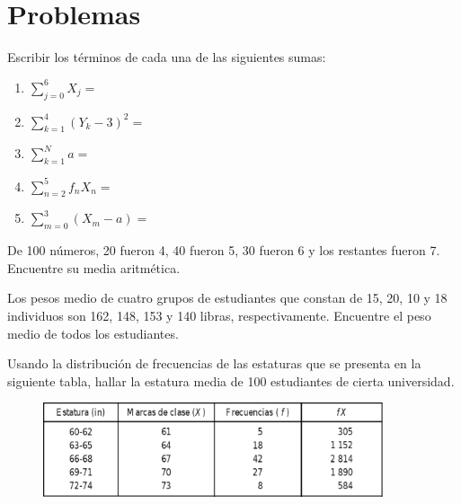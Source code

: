 \section*{Problemas}

\begin{problema} \label{problema:3.1}
	Escribir los términos de cada una de las siguientes sumas:
	\begin{enumerate}
		\item $\displaystyle\sum_{j=0}^{6}X_{j}=$ 
		\item $\displaystyle\sum_{k=1}^{4}\left( Y_{k}-3 \right)^{2}=$ 
		\item $\displaystyle\sum_{k=1}^{N}a=$ 
		\item $\displaystyle\sum_{n=2}^{5}{f_{n}}X_{n}= $ 
		\item $\displaystyle\sum_{m=0}^{3}\left( X_{m}-a \right)=$
	\end{enumerate}
\end{problema}
%


\begin{problema}
	\label{problema:3.10}
	De 100 números, 20 fueron 4, 40 fueron 5, 30 fueron 6 y los restantes fueron 7. Encuentre su media aritmética.
\end{problema}




\begin{problema}
	\label{problema:3.13}
	Los pesos medio de cuatro grupos de estudiantes que constan de 15, 20, 10 y 18 individuos son 162, 148, 153 y 140 libras, respectivamente. Encuentre el peso medio de todos los estudiantes.
\end{problema}



%

\begin{problema}
	\label{problema:3.15}
	
	Usando la distribución de frecuencias de las estaturas que se presenta en la siguiente tabla, hallar la estatura media de 100 estudiantes de cierta universidad.
	\begin{figure}
		\centering
		\includegraphics[width=10cm,keepaspectratio=true]{./images/tab0301.png}
		\label{tab:0301}
	\end{figure}
\end{problema}




